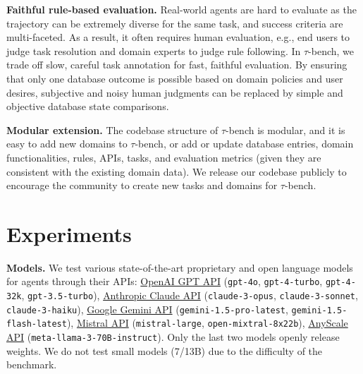 \documentclass{article}
\newcommand{\benchmark}{$\tau$-bench}
\begin{document}
\textbf{Faithful rule-based evaluation.} Real-world agents are hard to evaluate as the trajectory can be extremely diverse for the same task, and success criteria are multi-faceted. As a result, it often requires human evaluation, e.g., end users to judge task resolution and domain experts to judge rule following. In \benchmark{}, we trade off slow, careful task annotation for fast, faithful evaluation. By ensuring that only one database outcome is possible based on domain policies and user desires, subjective and noisy human judgments can be replaced by simple and objective database state comparisons.


\textbf{Modular extension.} The codebase structure of \benchmark{} is modular, and it is easy to add new domains to \benchmark{}, or add or update database entries, domain functionalities, rules, APIs, tasks, and evaluation metrics (given they are consistent with the existing domain data). We release our codebase publicly to encourage the community to create new tasks and domains for \benchmark{}.





\section{Experiments} \label{sec:experiments}




\textbf{Models.} We test various state-of-the-art proprietary and open language models for agents through their APIs: 
    \href{https://openai.com/api/}{OpenAI GPT API} (\texttt{gpt-4o}, \texttt{gpt-4-turbo}, \texttt{gpt-4-32k}, \texttt{gpt-3.5-turbo}),
    \href{https://www.anthropic.com/api}{Anthropic Claude API} (\texttt{claude-3-opus}, \texttt{claude-3-sonnet}, \texttt{claude-3-haiku}), %
    \href{https://ai.google.dev/gemini-api/}{Google Gemini API} (\texttt{gemini-1.5-pro-latest}, \texttt{gemini-1.5-flash-latest}), %
    \href{https://docs.mistral.ai/api/}{Mistral API} (\texttt{mistral-large}, \texttt{open-mixtral-8x22b}),
    \href{https://console.anyscale.com}{AnyScale API} (\texttt{meta-llama-3-70B-instruct}).
Only the last two models openly release weights. We do not test small models (7/13B) due to the difficulty of the benchmark.
\end{document}
